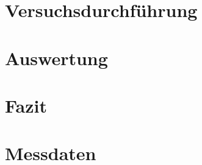 \documentclass[
    oneside, 
    footinclude=off, 
    captions=tableheading, 
    DIV=12;usenames,
    dvipsnames
]{scrartcl}
\begin{document}
\newpage
\section{Versuchsdurchführung} %
    

\newpage
\section{Auswertung}
    

\newpage
\section{Fazit}
    


\newpage
    
\newpage
    \listoffigures
    \listoftables


\newpage
    \section*{Messdaten}
    
\newpage
    



%
\end{document}
